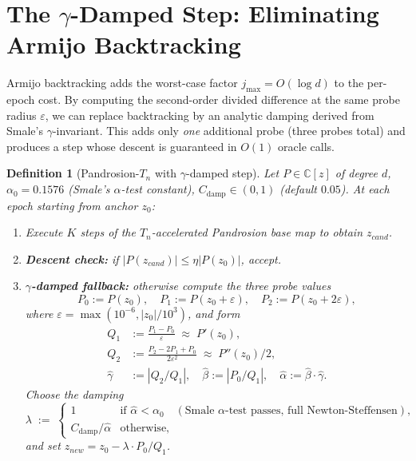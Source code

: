 \documentclass[11pt,a4paper]{article}
\newtheorem{definition}[theorem]{Definition}
\begin{document}
\section{The $\gamma$-Damped Step: Eliminating Armijo Backtracking}\label{sec:gamma-damped}

Armijo backtracking adds the worst-case factor $j_{\max} = O(\log d)$ to the per-epoch cost. By computing the second-order divided difference at the same probe radius $\varepsilon$, we can replace backtracking by an analytic damping derived from Smale's $\gamma$-invariant. This adds only \emph{one} additional probe (three probes total) and produces a step whose descent is guaranteed in $O(1)$ oracle calls.

\begin{definition}[Pandrosion-$T_n$ with $\gamma$-damped step]\label{def:gamma-damped}
Let $P \in \mathbb{C}[z]$ of degree $d$, $\alpha_0 = 0.1576$ (Smale's $\alpha$-test constant), $C_{\text{damp}} \in (0, 1)$ (default $0.05$). At each epoch starting from anchor $z_0$:
\begin{enumerate}
    \item Execute $K$ steps of the $T_n$-accelerated Pandrosion base map to obtain $z_{cand}$.
    \item \textbf{Descent check:} if $|P(z_{cand})| \le \eta |P(z_0)|$, accept.
    \item \textbf{$\gamma$-damped fallback:} otherwise compute the three probe values
    $$ P_0 := P(z_0), \quad P_1 := P(z_0 + \varepsilon), \quad P_2 := P(z_0 + 2\varepsilon), $$
    where $\varepsilon = \max\!\left(10^{-6}, |z_0|/10^3\right)$, and form
    \begin{align*}
    Q_1 &:= \frac{P_1 - P_0}{\varepsilon} \;\approx\; P'(z_0), \\
    Q_2 &:= \frac{P_2 - 2 P_1 + P_0}{2 \varepsilon^2} \;\approx\; P''(z_0)/2, \\
    \widehat\gamma &:= |Q_2/Q_1|, \quad \widehat\beta := |P_0/Q_1|, \quad \widehat\alpha := \widehat\beta \cdot \widehat\gamma.
    \end{align*}
    Choose the damping
    $$ \lambda \;:=\; \begin{cases} 1 & \text{if } \widehat\alpha < \alpha_0 \quad (\text{Smale } \alpha\text{-test passes, full Newton-Steffensen}), \\ C_{\text{damp}} / \widehat\alpha & \text{otherwise}, \end{cases} $$
    and set $z_{new} = z_0 - \lambda \cdot P_0/Q_1$.
\end{enumerate}
\end{definition}
\end{document}
